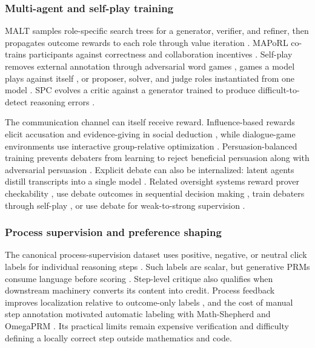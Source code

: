 \subsubsection{Multi-agent and self-play training}
\label{supp:subsec:learning-multiagent}

MALT samples role-specific search trees for a generator, verifier, and refiner, then propagates outcome rewards to each role through value iteration \citep{motwani2024malt}. MAPoRL co-trains participants against correctness and collaboration incentives \citep{park2025maporl}. Self-play removes external annotation through adversarial word games \citep{cheng2024selfplaying}, games a model plays against itself \citep{kuba2025language}, or proposer, solver, and judge roles instantiated from one model \citep{chen2025multiagent}. SPC evolves a critic against a generator trained to produce difficult-to-detect reasoning errors \citep{chen2025spc}.

The communication channel can itself receive reward. Influence-based rewards elicit accusation and evidence-giving in social deduction \citep{sarkar2025training}, while dialogue-game environments use interactive group-relative optimization \citep{horst2025playpen}. Persuasion-balanced training prevents debaters from learning to reject beneficial persuasion along with adversarial persuasion \citep{stengeleskin2024teaching}. Explicit debate can also be internalized: latent agents distill transcripts into a single model \citep{yi2026latent}. Related oversight systems reward prover checkability \citep{kirchner2024prover}, use debate outcomes in sequential decision making \citep{sukovic2024reward}, train debaters through self-play \citep{arnesen2024training}, or use debate for weak-to-strong supervision \citep{lang2025debate}.

\subsubsection{Process supervision and preference shaping}
\label{supp:subsec:learning-process}

The canonical process-supervision dataset uses positive, negative, or neutral click labels for individual reasoning steps \citep{lightman2024let}. Such labels are scalar, but generative PRMs consume language before scoring \citep{zhao2025genprm,liu2025agenticreinforcementlearningimplicit}. Step-level critique also qualifies when downstream machinery converts its content into credit. Process feedback improves localization relative to outcome-only labels \citep{lightman2024let,uesato2022solving}, and the cost of manual step annotation motivated automatic labeling with Math-Shepherd and OmegaPRM \citep{wang2024mathshepherd,luo2024improve}. Its practical limits remain expensive verification and difficulty defining a locally correct step outside mathematics and code.


